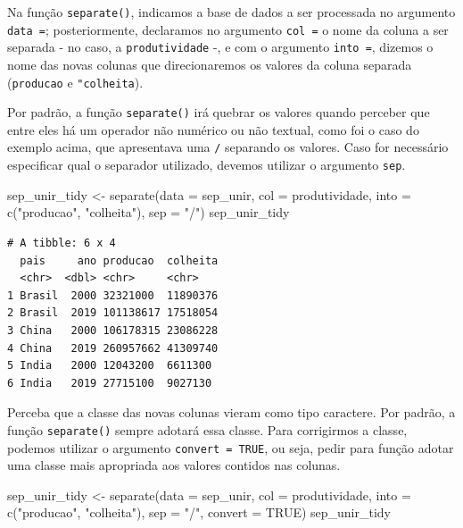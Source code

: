 \documentclass[
  brazilian,
]{book}
\newenvironment{Shaded}{\begin{snugshade}}{\end{snugshade}}
\newcommand{\AttributeTok}[1]{\textcolor[rgb]{0.77,0.63,0.00}{#1}}
\newcommand{\ConstantTok}[1]{\textcolor[rgb]{0.00,0.00,0.00}{#1}}
\newcommand{\FunctionTok}[1]{\textcolor[rgb]{0.00,0.00,0.00}{#1}}
\newcommand{\NormalTok}[1]{#1}
\newcommand{\OtherTok}[1]{\textcolor[rgb]{0.56,0.35,0.01}{#1}}
\newcommand{\StringTok}[1]{\textcolor[rgb]{0.31,0.60,0.02}{#1}}
\begin{document}
Na função \texttt{separate()}, indicamos a base de dados a ser processada no argumento \texttt{data\ =}; posteriormente, declaramos no argumento \texttt{col\ =} o nome da coluna a ser separada - no caso, a \texttt{produtividade} -, e com o argumento \texttt{into\ =}, dizemos o nome das novas colunas que direcionaremos os valores da coluna separada (\texttt{producao} e \texttt{"colheita}).

Por padrão, a função \texttt{separate()} irá quebrar os valores quando perceber que entre eles há um operador não numérico ou não textual, como foi o caso do exemplo acima, que apresentava uma \texttt{/} separando os valores. Caso for necessário especificar qual o separador utilizado, devemos utilizar o argumento \texttt{sep}.

\begin{Shaded}
\begin{Highlighting}[]
\NormalTok{sep\_unir\_tidy }\OtherTok{\textless{}{-}} \FunctionTok{separate}\NormalTok{(}\AttributeTok{data =}\NormalTok{ sep\_unir,}
                          \AttributeTok{col =}\NormalTok{ produtividade,}
                          \AttributeTok{into =} \FunctionTok{c}\NormalTok{(}\StringTok{"producao"}\NormalTok{, }\StringTok{"colheita"}\NormalTok{),}
                          \AttributeTok{sep =} \StringTok{"/"}\NormalTok{)}
\NormalTok{sep\_unir\_tidy}
\end{Highlighting}
\end{Shaded}

\begin{verbatim}
# A tibble: 6 x 4
  pais     ano producao  colheita
  <chr>  <dbl> <chr>     <chr>   
1 Brasil  2000 32321000  11890376
2 Brasil  2019 101138617 17518054
3 China   2000 106178315 23086228
4 China   2019 260957662 41309740
5 India   2000 12043200  6611300 
6 India   2019 27715100  9027130 
\end{verbatim}

Perceba que a classe das novas colunas vieram como tipo caractere. Por padrão, a função \texttt{separate()} sempre adotará essa classe. Para corrigirmos a classe, podemos utilizar o argumento \texttt{convert\ =\ TRUE}, ou seja, pedir para função adotar uma classe mais apropriada aos valores contidos nas colunas.

\begin{Shaded}
\begin{Highlighting}[]
\NormalTok{sep\_unir\_tidy }\OtherTok{\textless{}{-}} \FunctionTok{separate}\NormalTok{(}\AttributeTok{data =}\NormalTok{ sep\_unir,}
                          \AttributeTok{col =}\NormalTok{ produtividade,}
                          \AttributeTok{into =} \FunctionTok{c}\NormalTok{(}\StringTok{"producao"}\NormalTok{, }\StringTok{"colheita"}\NormalTok{),}
                          \AttributeTok{sep =} \StringTok{"/"}\NormalTok{,}
                          \AttributeTok{convert =} \ConstantTok{TRUE}\NormalTok{)}
\NormalTok{sep\_unir\_tidy}
\end{Highlighting}
\end{Shaded}
\end{document}
